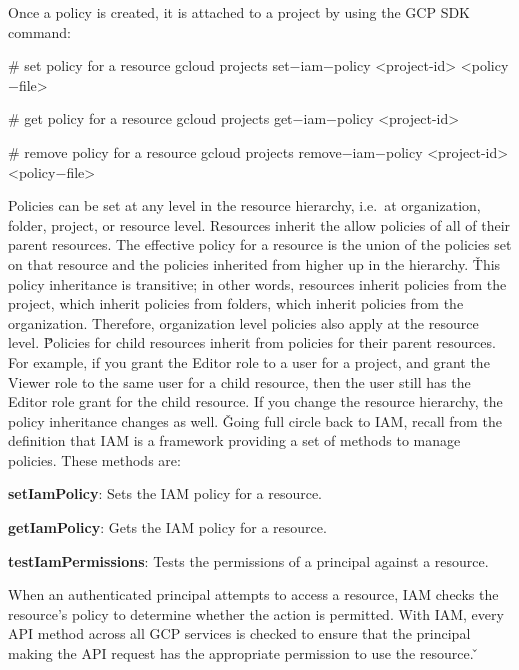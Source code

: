 Once a policy is created, it is attached to a project by using the GCP SDK command:
\begin{bash}
# set policy for a resource
gcloud projects set$-$iam$-$policy <project-id> <policy$-$file>
\end{bash}

\begin{bash}
# get policy for a resource
gcloud projects get$-$iam$-$policy <project-id>
\end{bash}

\begin{bash}
# remove policy for a resource
gcloud projects remove$-$iam$-$policy <project-id> <policy$-$file>
\end{bash}

Policies can be set at any level in the resource hierarchy, i.e.\ at organization, folder, project, or resource level.
Resources inherit the allow policies of all of their parent resources. The effective policy for a resource is the
union of the policies set on that resource and the policies inherited from higher up in the hierarchy. \v

This policy inheritance is transitive; in other words, resources inherit policies from the project, which inherit
policies from folders, which inherit policies from the organization. Therefore, organization level policies also
apply at the resource level. \v

Policies for child resources inherit from policies for their parent resources. For example, if you grant
the Editor role to a user for a project, and grant the Viewer role to the same user for a child resource, then the
user still has the Editor role grant for the child resource. If you change the resource hierarchy, the policy
inheritance changes as well. \v

Going full circle back to IAM, recall from the definition that IAM is a framework providing a set of methods to manage
policies. These methods are:
\bit
\item \textbf{setIamPolicy}: Sets the IAM policy for a resource.
\item \textbf{getIamPolicy}: Gets the IAM policy for a resource.
\item \textbf{testIamPermissions}: Tests the permissions of a principal against a resource.
\eit

When an authenticated principal attempts to access a resource, IAM checks the resource's policy to determine whether
the action is permitted. With IAM, every API method across all GCP services is checked to ensure that the principal
making the API request has the appropriate permission to use the resource. \v

